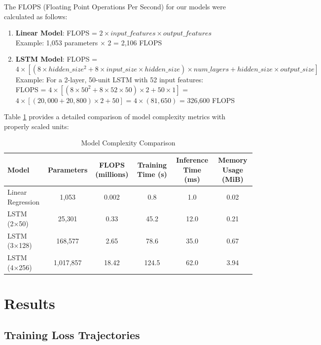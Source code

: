 \documentclass[sigconf]{acmart}
\begin{document}
The FLOPS (Floating Point Operations Per Second) for our models were calculated as follows:

\begin{enumerate}
\item \textbf{Linear Model}: FLOPS = $2 \times input\_features \times output\_features$  \\
   Example: 1,053 parameters $\times$ 2 = 2,106 FLOPS

\item \textbf{LSTM Model}: FLOPS = $4 \times [(8 \times hidden\_size^2 + 8 \times input\_size \times hidden\_size) \times num\_layers + hidden\_size \times output\_size]$ \\
   Example: For a 2-layer, 50-unit LSTM with 52 input features:  \\
   FLOPS = $4 \times [(8 \times 50^2 + 8 \times 52 \times 50) \times 2 + 50 \times 1]$ = $4 \times [(20,000 + 20,800) \times 2 + 50]$ = $4 \times (81,650)$ = 326,600 FLOPS
\end{enumerate}

Table \ref{tab:complexity} provides a detailed comparison of model complexity metrics with properly scaled units:

\begin{table}[h]
\caption{Model Complexity Comparison}
\label{tab:complexity}
\begin{tabular}{lccccc}
\toprule
\textbf{Model} & \textbf{Parameters} & \textbf{FLOPS (millions)} & \textbf{Training Time (s)} & \textbf{Inference Time (ms)} & \textbf{Memory Usage (MiB)} \\
\midrule
Linear Regression & 1,053 & 0.002 & 0.8 & 1.0 & 0.02 \\
LSTM (2×50) & 25,301 & 0.33 & 45.2 & 12.0 & 0.21 \\
LSTM (3×128) & 168,577 & 2.65 & 78.6 & 35.0 & 0.67 \\
LSTM (4×256) & 1,017,857 & 18.42 & 124.5 & 62.0 & 3.94 \\
\bottomrule
\end{tabular}
\end{table}

\section{Results}

\subsection{Training Loss Trajectories}
\end{document}
